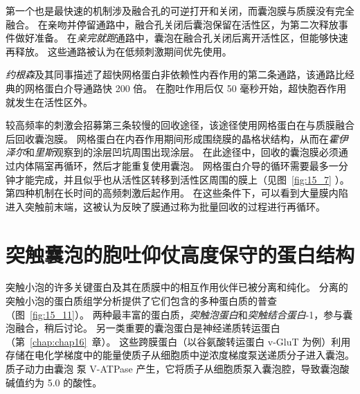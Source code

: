 第一个也是最快速的机制涉及融合孔的可逆打开和关闭，而囊泡膜与质膜没有完全融合。
在亲吻并停留通路中，融合孔关闭后囊泡保留在活性区，为第二次释放事件做好准备。
在\textit{亲完就跑}通路中，囊泡在融合孔关闭后离开活性区，但能够快速再释放。
这些通路被认为在低频刺激期间优先使用。


\textit{约根森}及其同事描述了超快网格蛋白非依赖性内吞作用的第二条通路，该通路比经典的网格蛋白介导通路快 200 倍。
在胞吐作用后仅 50 毫秒开始，超快胞吞作用就发生在活性区外。


较高频率的刺激会招募第三条较慢的回收途径，该途径使用网格蛋白在与质膜融合后回收囊泡膜。
网格蛋白在内吞作用期间形成围绕膜的晶格状结构，从而在\textit{霍伊泽尔}和\textit{里斯}观察到的涂层凹坑周围出现涂层。
在此途径中，回收的囊泡膜必须通过内体隔室再循环，然后才能重复使用囊泡。
网格蛋白介导的循环需要最多一分钟才能完成，并且似乎也从活性区转移到活性区周围的膜上（见图~\ref{fig:15_7} ）。
第四种机制在长时间的高频刺激后起作用。
在这些条件下，可以看到大量膜内陷进入突触前末端，这被认为反映了膜通过称为批量回收的过程进行再循环。



\section{突触囊泡的胞吐仰仗高度保守的蛋白结构}

突触小泡的许多关键蛋白及其在质膜中的相互作用伙伴已被分离和纯化。
分离的突触小泡的蛋白质组学分析提供了它们包含的多种蛋白质的普查（图~\ref{fig:15_11}）。
两种最丰富的蛋白质，\textit{突触泡蛋白}和\textit{突触结合蛋白}-1，参与囊泡融合，稍后讨论。
另一类重要的囊泡蛋白是神经递质转运蛋白（第~\ref{chap:chap16}~章）。
这些跨膜蛋白（以谷氨酸转运蛋白 v-GluT 为例）利用存储在电化学梯度中的能量使质子从细胞质中逆浓度梯度泵送递质分子进入囊泡。
质子动力由囊泡  泵 V-ATPase 产生，它将质子从细胞质泵入囊泡腔，导致囊泡酸碱值约为 5.0 的酸性。


